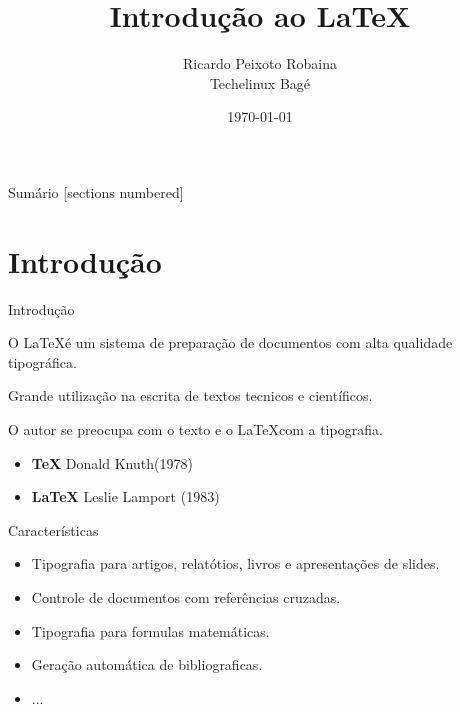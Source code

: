 \documentclass{beamer}
\title{Introdução ao \LaTeX}
\date{\today}
\author{Ricardo Peixoto Robaina \\ Techelinux Bagé}
\institute{Universidade Federal do Pampa}
\begin{document}
	
	\begin{frame}[noframenumbering]
		\titlepage
		\thispagestyle{empty}
	\end{frame}
	
	\begin{frame}{Sumário}
		[sections numbered]
		\tableofcontents[hideallsubsections]
	\end{frame}

\section{Introdução}
\begin{frame}{Introdução}
	
	
	O \LaTeX é um sistema de preparação de documentos com alta qualidade tipográfica.

	
	Grande utilização na escrita de textos tecnicos e científicos.
	
	
	O autor se preocupa com o texto e o \LaTeX com a tipografia.
	
	\begin{itemize}
		\item \textbf{TeX} Donald Knuth(1978)  
		\item \textbf{\LaTeX} Leslie Lamport (1983)
	\end{itemize}

\end{frame}

\begin{frame}{Características}
	\begin{itemize}
		\item Tipografia para artigos, relatótios, livros e apresentações de slides.
		\item Controle de documentos com referências cruzadas.
		\item Tipografia para formulas matemáticas.
		\item Geração automática de bibliograficas.
		\item ...
	\end{itemize}
\end{frame}
\end{document}
